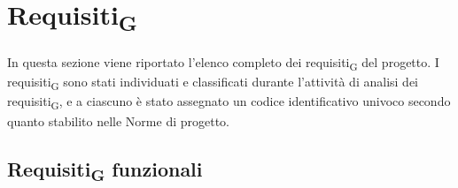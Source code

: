 \section{Requisiti\textsubscript{G}}
In questa sezione viene riportato l'elenco completo dei requisiti\textsubscript{G} del progetto.
I requisiti\textsubscript{G} sono stati individuati e classificati durante l'attività di analisi dei requisiti\textsubscript{G}, e a ciascuno è stato assegnato un codice identificativo univoco secondo quanto stabilito nelle Norme di progetto.

\subsection{Requisiti\textsubscript{G} funzionali}

\setlength\extrarowheight{5pt}
